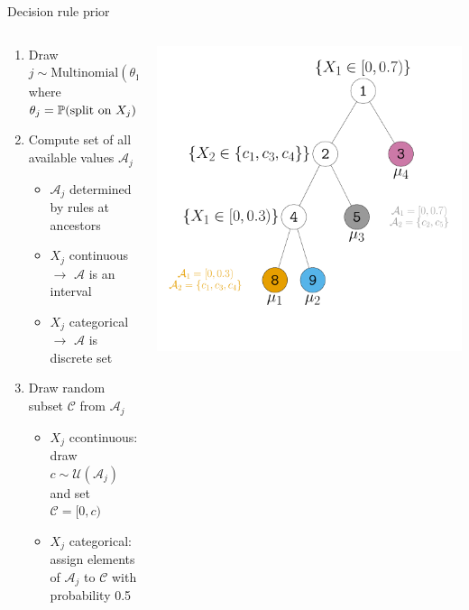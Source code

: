 \documentclass[aspectratio=199]{beamer}
\begin{document}
\begin{frame}[noframenumbering]{Decision rule prior}

\begin{columns}

\begin{column}{0.6\textwidth}
\begin{enumerate}
\item{Draw $j \sim \text{Multinomial}(\theta_{1}, \ldots, \theta_{p})$ where $\theta_{j} = \P(\text{split on $X_{j}$})$}
\item{Compute set of all available values $\mathcal{A}_{j}$}
\begin{itemize}
\item{$\mathcal{A}_{j}$ determined by rules at ancestors}
\item{$X_{j}$ continuous $\rightarrow$ $\mathcal{A}$ is an interval}
\item{$X_{j}$ categorical $\rightarrow$ $\mathcal{A}$ is discrete set}
\end{itemize}
\item{Draw random subset $\mathcal{C}$ from $\mathcal{A}_{j}$}
\begin{itemize}
\item{$X_{j}$ ccontinuous: draw $c \sim \mathcal{U}(\mathcal{A}_{j})$ and set $\mathcal{C} = [0,c)$}
\item{$X_{j}$ categorical: assign elements of $\mathcal{A}_{j}$ to $\mathcal{C}$ with probability 0.5}
\end{itemize}
\end{enumerate}

\end{column}
\begin{column}{0.4\textwidth}
\centering
\includegraphics[width = \textwidth]{figures/decision_rule_new}
\end{column}

\end{columns}
\end{frame}
\end{document}
